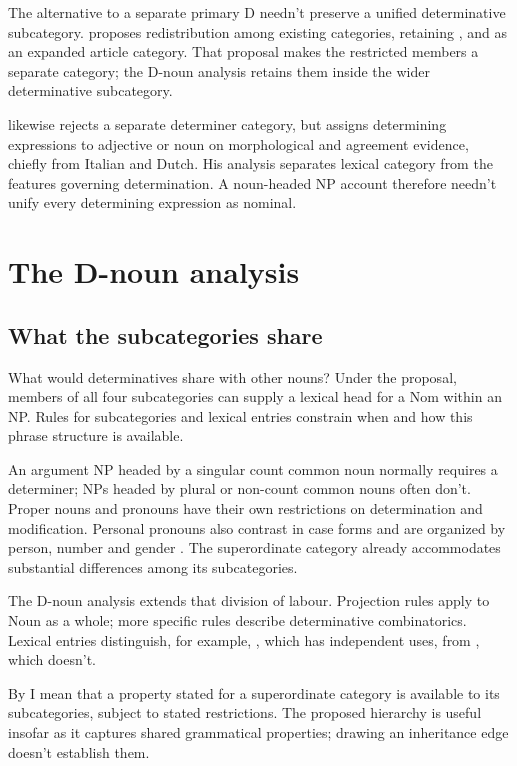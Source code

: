 \documentclass[12pt]{article}
\begin{document}
The alternative to a separate primary D needn't preserve a unified determinative subcategory. \textcite{spinillo2004reconceptualising} proposes redistribution among existing categories, retaining ,  and  as an expanded article category. That proposal makes the restricted members a separate category; the D-noun analysis retains them inside the wider determinative subcategory.

\textcite{vaneynde2003determiner} likewise rejects a separate determiner category, but assigns determining expressions to adjective or noun on morphological and agreement evidence, chiefly from Italian and Dutch. His analysis separates lexical category from the features governing determination. A noun-headed NP account therefore needn't unify every determining expression as nominal.


\section{The D-noun analysis}\label{sec:proposal}

\subsection{What the subcategories share}

What would determinatives share with other nouns? Under the proposal, members of all four subcategories can supply a lexical head for a Nom within an NP. Rules for subcategories and lexical entries constrain when and how this phrase structure is available.

An argument NP headed by a singular count common noun normally requires a determiner; NPs headed by plural or non-count common nouns often don't. Proper nouns and pronouns have their own restrictions on determination and modification. Personal pronouns also contrast in case forms and are organized by person, number and gender \citep[425--427]{huddleston2002}. The superordinate category already accommodates substantial differences among its subcategories.

The D-noun analysis extends that division of labour. Projection rules apply to Noun as a whole; more specific rules describe determinative combinatorics. Lexical entries distinguish, for example, , which has independent uses, from , which doesn't.

By  I mean that a property stated for a superordinate category is available to its subcategories, subject to stated restrictions. The proposed hierarchy is useful insofar as it captures shared grammatical properties; drawing an inheritance edge doesn't establish them.
\end{document}
